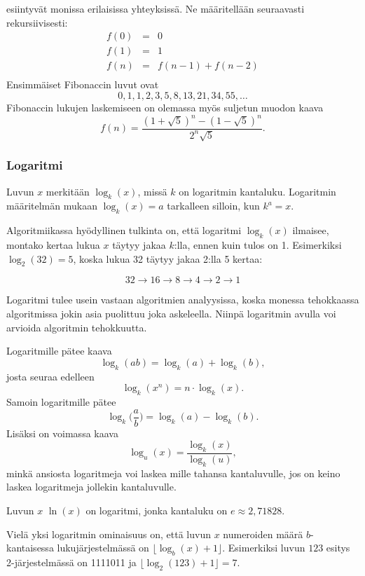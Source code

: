 
 esiintyvät monissa erilaisissa yhteyksissä.
Ne määritellään seuraavasti rekursiivisesti:
\[
\begin{array}{lcl}
f(0) & = & 0 \\
f(1) & = & 1 \\
f(n) & = & f(n-1)+f(n-2) \\
\end{array}
\]
Ensimmäiset Fibonaccin luvut ovat
\[0, 1, 1, 2, 3, 5, 8, 13, 21, 34, 55, \ldots\]
Fibonaccin lukujen laskemiseen on olemassa myös
suljetun muodon kaava
\[f(n)=\frac{(1 + \sqrt{5})^n - (1-\sqrt{5})^n}{2^n \sqrt{5}}.\]

\subsubsection{Logaritmi}


Luvun $x$
 merkitään $\log_k(x)$, missä $k$ on logaritmin kantaluku.
Logaritmin määritelmän mukaan
$\log_k(x)=a$ tarkalleen silloin, kun $k^a=x$.

Algoritmiikassa hyödyllinen tulkinta on,
että logaritmi $\log_k(x)$ ilmaisee, montako kertaa lukua $x$
täytyy jakaa $k$:lla, ennen kuin tulos on 1.
Esimerkiksi $\log_2(32)=5$,
koska lukua 32 täytyy jakaa 2:lla 5 kertaa:

\[32 \rightarrow 16 \rightarrow 8 \rightarrow 4 \rightarrow 2 \rightarrow 1 \]

Logaritmi tulee usein vastaan algoritmien analyysissa,
koska monessa tehokkaassa algoritmissa jokin asia puolittuu
joka askeleella.
Niinpä logaritmin avulla voi arvioida algoritmin tehokkuutta.

Logaritmille pätee kaava
\[\log_k(ab) = \log_k(a)+\log_k(b),\]
josta seuraa edelleen
\[\log_k(x^n) = n \cdot \log_k(x).\]
Samoin logaritmille pätee
\[\log_k\Big(\frac{a}{b}\Big) = \log_k(a)-\log_k(b).\]
Lisäksi on voimassa kaava
\[\log_u(x) = \frac{\log_k(x)}{\log_k(u)},\]
minkä ansiosta logaritmeja voi laskea mille tahansa kantaluvulle,
jos on keino laskea logaritmeja jollekin kantaluvulle.


Luvun $x$  $\ln(x)$ on logaritmi, jonka kantaluku on
 $e \approx 2{,}71828$.

Vielä yksi logaritmin ominaisuus on, että
luvun $x$ numeroiden määrä $b$-kantaisessa
lukujärjestelmässä
on $\lfloor \log_b(x)+1 \rfloor$.
Esimerkiksi luvun $123$ esitys
2-järjestelmässä on 1111011 ja
$\lfloor \log_2(123)+1 \rfloor = 7$.

